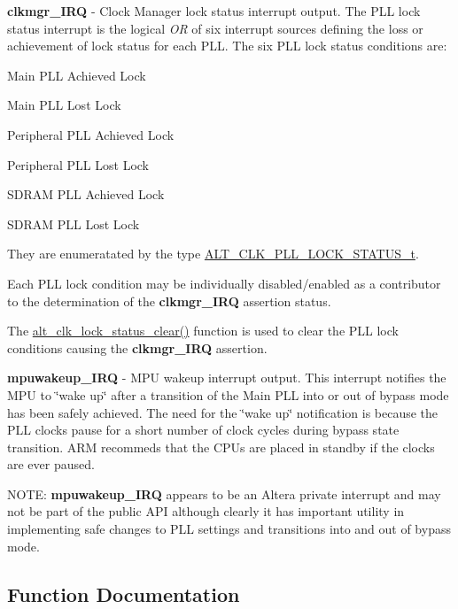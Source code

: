 \begin{DoxyItemize}
\item {\bfseries{clkmgr\+\_\+\+I\+RQ}} -\/ Clock Manager lock status interrupt output. The P\+LL lock status interrupt is the logical {\itshape OR} of six interrupt sources defining the loss or achievement of lock status for each P\+LL. The six P\+LL lock status conditions are\+:
\begin{DoxyItemize}
\item Main P\+LL Achieved Lock
\item Main P\+LL Lost Lock
\item Peripheral P\+LL Achieved Lock
\item Peripheral P\+LL Lost Lock
\item S\+D\+R\+AM P\+LL Achieved Lock
\item S\+D\+R\+AM P\+LL Lost Lock
\end{DoxyItemize}

They are enumeratated by the type \mbox{\hyperlink{group__CLK__MGR__STATUS_ga62fbfc277685cad341f57ee0a252092c}{A\+L\+T\+\_\+\+C\+L\+K\+\_\+\+P\+L\+L\+\_\+\+L\+O\+C\+K\+\_\+\+S\+T\+A\+T\+U\+S\+\_\+t}}.

Each P\+LL lock condition may be individually disabled/enabled as a contributor to the determination of the {\bfseries{clkmgr\+\_\+\+I\+RQ}} assertion status.

The \mbox{\hyperlink{group__CLK__MGR__STATUS_ga8418718b0efdf2b2c69242265ff1581a}{alt\+\_\+clk\+\_\+lock\+\_\+status\+\_\+clear()}} function is used to clear the P\+LL lock conditions causing the {\bfseries{clkmgr\+\_\+\+I\+RQ}} assertion.
\item {\bfseries{mpuwakeup\+\_\+\+I\+RQ}} -\/ M\+PU wakeup interrupt output. This interrupt notifies the M\+PU to \char`\"{}wake up\char`\"{} after a transition of the Main P\+LL into or out of bypass mode has been safely achieved. The need for the \char`\"{}wake up\char`\"{} notification is because the P\+LL clocks pause for a short number of clock cycles during bypass state transition. A\+RM recommeds that the C\+P\+Us are placed in standby if the clocks are ever paused.
\end{DoxyItemize}

N\+O\+TE\+: {\bfseries{mpuwakeup\+\_\+\+I\+RQ}} appears to be an Altera private interrupt and may not be part of the public A\+PI although clearly it has important utility in implementing safe changes to P\+LL settings and transitions into and out of bypass mode. 

\subsection{Function Documentation}
\mbox{\label{group__CLK__MGR__INT_gaa37c8af166f14f2dc8c6712d9a4a4085}} 
